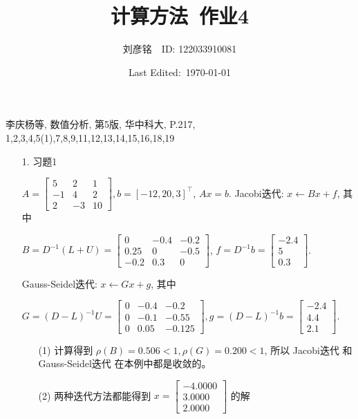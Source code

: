 \documentclass{article}
\title{计算方法\ 作业4}
\author{刘彦铭\ \ ID: 122033910081}
\date{Last Edited:\ \today}
\begin{document}
\maketitle

李庆杨等, 数值分析, 第5版, 华中科大, P.217,
1,2,3,4,5(1),7,8,9,11,12,13,14,15,16,18,19

\begin{spacing}{1.5}

\begin{itemize}
    \item [1.] 习题1
    
    $A =\left[\begin{array}{ccc}5&2&1\\-1&4&2\\2&-3&10\end{array}\right], b=\left[-12,20,3\right]^\top$, $Ax = b$. Jacobi迭代: $x \leftarrow Bx + f$, 其中 
    
    $B = D^{-1}(L+U) = \left[\begin{array}{ccc}
        0 & -0.4 & -0.2 \\ 0.25 &   0 & -0.5 \\ -0.2 & 0.3 &   0
    \end{array}\right]$,
    $f = D^{-1}b = \left[\begin{array}{c}
        -2.4 \\   5 \\ 0.3
    \end{array}\right]$.

    Gauss-Seidel迭代: $x \leftarrow Gx + g$, 其中 
    
    $G = (D-L)^{-1}U = \left[\begin{array}{ccc}
        0 & -0.4 & -0.2 \\   0 & -0.1 & -0.55 \\   0 & 0.05 & -0.125
    \end{array}\right], 
    g = (D-L)^{-1}b=\left[\begin{array}{c}
        -2.4 \\ 4.4 \\ 2.1
    \end{array}\right]$.

    \begin{itemize}
        \item [(1)] 计算得到 $\rho(B) = 0.506 < 1, \rho(G) = 0.200 < 1$, 所以 Jacobi迭代 和 Gauss-Seidel迭代 在本例中都是收敛的。
        \item [(2)] 两种迭代方法都能得到 $x =   \left[\begin{array}{c}
            -4.0000 \\ 3.0000 \\   2.0000
        \end{array}\right]$ 的解


\end{itemize}
\end{itemize}
\end{spacing}
\end{document}
